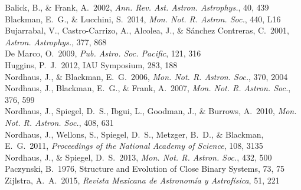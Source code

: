 \documentclass{iau_FM}
\begin{document}
\begin{thebibliography}{}

 Balick, B., \& Frank, A.\ 2002, {\it Ann. Rev. Ast. Astron. Astrophys.}, 40, 439\\

 Blackman, E.~G., \& Lucchini, S.\ 2014, {\it Mon. Not. R. Astron. Soc.}, 440, L16\\

 Bujarrabal, V., Castro-Carrizo, A., Alcolea, J., \& S{\'a}nchez Contreras, C.\ 2001, {\it Astron. Astrophys.}, 377, 868\\

 De Marco, O.\ 2009, {\it Pub. Astro. Soc. Pacific}, 121, 316\\

 Huggins, P.~J.\ 2012, IAU Symposium, 283, 188\\

 Nordhaus, J., \& Blackman, E.~G.\ 2006, {\it Mon. Not. R. Astron. Soc.}, 370, 2004\\

 Nordhaus, J., Blackman, E.~G., \& Frank, A.\ 2007, {\it Mon. Not. R. Astron. Soc.}, 376, 599\\

 Nordhaus, J., Spiegel, D.~S., Ibgui, L., Goodman, J., \& Burrows, A.\ 2010, {\it Mon. Not. R. Astron. Soc.}, 408, 631\\

 Nordhaus, J., Wellons, S., Spiegel, D.~S., Metzger, B.~D., \& Blackman, E.~G.\ 2011, {\it Proceedings of the National Academy of Science}, 108, 3135\\

 Nordhaus, J., \& Spiegel, D.~S.\ 2013, {\it Mon. Not. R. Astron. Soc.}, 432, 500\\

 Paczynski, B.\ 1976, Structure and Evolution of Close Binary Systems, 73, 75\\


 Zijlstra, A.~A.\ 2015, {\it Revista Mexicana de Astronomía y Astrofísica}, 51, 221\\

\end{thebibliography}


\end{document}
